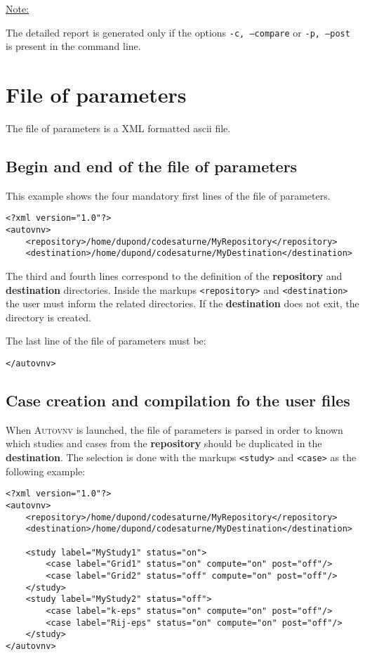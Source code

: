 \documentclass[a4paper,10pt,twoside]{csshortdoc}
\begin{document}
\underline{Note:}

The detailed report is generated only if the options \texttt{-c, --compare}
or \texttt{-p, --post} is present in the command line.

\section{File of parameters}

The file of parameters is a XML formatted ascii file.

\subsection{Begin and end of the file of parameters}

This example shows the four mandatory first lines of the file of parameters.

\small
\begin{verbatim}
<?xml version="1.0"?>
<autovnv>
    <repository>/home/dupond/codesaturne/MyRepository</repository>
    <destination>/home/dupond/codesaturne/MyDestination</destination>
\end{verbatim}
\normalsize

The third and fourth lines correspond to the definition of the
\textbf{repository} and \textbf{destination} directories.
Inside the markups \texttt{<repository>} and \texttt{<destination>} the user
must inform the related directories. If the \textbf{destination} does not exit,
the directory is created.

The last line of the file of parameters must be:

\small
\begin{verbatim}
</autovnv>
\end{verbatim}
\normalsize

\subsection{Case creation and compilation fo the user files}

When \textsc{Autovnv} is launched, the file of parameters is parsed in order to
known which studies and cases from the \textbf{repository} should be duplicated
in the \textbf{destination}. The selection is done with the markups
\texttt{<study>} and \texttt{<case>} as the following example:

\small
\begin{verbatim}
<?xml version="1.0"?>
<autovnv>
    <repository>/home/dupond/codesaturne/MyRepository</repository>
    <destination>/home/dupond/codesaturne/MyDestination</destination>

    <study label="MyStudy1" status="on">
        <case label="Grid1" status="on" compute="on" post="off"/>
        <case label="Grid2" status="off" compute="on" post="off"/>
    </study>
    <study label="MyStudy2" status="off">
        <case label="k-eps" status="on" compute="on" post="off"/>
        <case label="Rij-eps" status="on" compute="on" post="off"/>
    </study>
</autovnv>
\end{verbatim}
\normalsize
\end{document}

